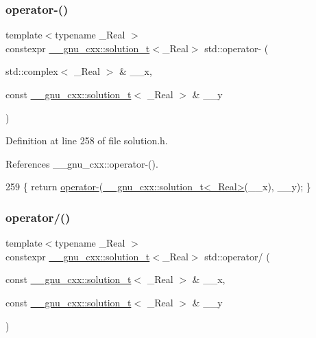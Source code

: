 \subsubsection{\texorpdfstring{operator-\/()}{operator-()}\hspace{0.1cm}{\footnotesize\ttfamily [6/6]}}
{\footnotesize\ttfamily template$<$typename \+\_\+\+Real $>$ \\
constexpr \hyperlink{namespace____gnu__cxx_ae20ea642de50eb361074c62676b0159c}{\+\_\+\+\_\+gnu\+\_\+cxx\+::solution\+\_\+t}$<$\+\_\+\+Real$>$ std\+::operator-\/ (\begin{DoxyParamCaption}\item[{std\+::complex$<$ \+\_\+\+Real $>$ \&}]{\+\_\+\+\_\+x,  }\item[{const \hyperlink{namespace____gnu__cxx_ae20ea642de50eb361074c62676b0159c}{\+\_\+\+\_\+gnu\+\_\+cxx\+::solution\+\_\+t}$<$ \+\_\+\+Real $>$ \&}]{\+\_\+\+\_\+y }\end{DoxyParamCaption})}



Definition at line 258 of file solution.\+h.



References \+\_\+\+\_\+gnu\+\_\+cxx\+::operator-\/().


\begin{DoxyCode}
259     \{ \textcolor{keywordflow}{return} \hyperlink{namespacestd_a4f4e9391eaa235d953faa99bff006e3d}{operator-}(\hyperlink{namespace____gnu__cxx_ae20ea642de50eb361074c62676b0159c}{\_\_gnu\_cxx::solution\_t<\_Real>}(\_\_x), \_\_y); \}
\end{DoxyCode}
\mbox{\label{namespacestd_aea656103e37e932d00b9980288f00fac}} 
\subsubsection{\texorpdfstring{operator/()}{operator/()}\hspace{0.1cm}{\footnotesize\ttfamily [1/5]}}
{\footnotesize\ttfamily template$<$typename \+\_\+\+Real $>$ \\
constexpr \hyperlink{namespace____gnu__cxx_ae20ea642de50eb361074c62676b0159c}{\+\_\+\+\_\+gnu\+\_\+cxx\+::solution\+\_\+t}$<$\+\_\+\+Real$>$ std\+::operator/ (\begin{DoxyParamCaption}\item[{const \hyperlink{namespace____gnu__cxx_ae20ea642de50eb361074c62676b0159c}{\+\_\+\+\_\+gnu\+\_\+cxx\+::solution\+\_\+t}$<$ \+\_\+\+Real $>$ \&}]{\+\_\+\+\_\+x,  }\item[{const \hyperlink{namespace____gnu__cxx_ae20ea642de50eb361074c62676b0159c}{\+\_\+\+\_\+gnu\+\_\+cxx\+::solution\+\_\+t}$<$ \+\_\+\+Real $>$ \&}]{\+\_\+\+\_\+y }\end{DoxyParamCaption})}

